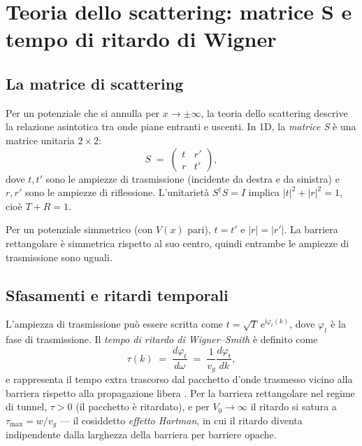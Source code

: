 \documentclass[12pt, a4paper]{article}
\newcommand{\ii}{\mathrm{i}}          %
\newcommand{\ee}{\mathrm{e}}          %
\begin{document}
\section{Teoria dello scattering: matrice S e tempo di ritardo di Wigner}
\label{app:scattering}

\subsection{La matrice di scattering}

Per un potenziale che si annulla per $x \to \pm\infty$, la teoria dello
scattering descrive la relazione asintotica tra onde piane entranti e
uscenti. In 1D, la \emph{matrice S} è una matrice unitaria $2\times 2$:
\begin{equation}
  S \;=\;
  \begin{pmatrix}
    t   & r' \\
    r   & t'
  \end{pmatrix},
\end{equation}
dove $t, t'$ sono le ampiezze di trasmissione (incidente da destra e da
sinistra) e $r, r'$ sono le ampiezze di riflessione. L'unitarietà
$S^\dagger S = I$ implica $|t|^2 + |r|^2 = 1$, cioè $T + R = 1$.

Per un potenziale simmetrico (con $V(x)$ pari), $t = t'$ e $|r| = |r'|$.
La barriera rettangolare è simmetrica rispetto al suo centro, quindi
entrambe le ampiezze di trasmissione sono uguali.

\subsection{Sfasamenti e ritardi temporali}

L'ampiezza di trasmissione può essere scritta come
$t = \sqrt{T}\,\ee^{\ii\varphi_t(k)}$, dove $\varphi_t$ è la fase di
trasmissione. Il \emph{tempo di ritardo di Wigner--Smith} è definito come
\begin{equation}
  \tau(k) \;=\; \frac{d\varphi_t}{d\omega}
  \;=\; \frac{1}{v_g}\frac{d\varphi_t}{dk},
  \label{eq:wigner}
\end{equation}
e rappresenta il tempo extra trascorso dal pacchetto d'onde trasmesso
vicino alla barriera rispetto alla propagazione libera \cite{Wigner1955}.
Per la barriera rettangolare nel regime di tunnel, $\tau > 0$ (il pacchetto
è ritardato), e per $V_0 \to \infty$ il ritardo si satura a
$\tau_\text{max} = w/v_g$ — il cosiddetto \emph{effetto Hartman}, in cui
il ritardo diventa indipendente dalla larghezza della barriera per barriere
opache.
\end{document}
